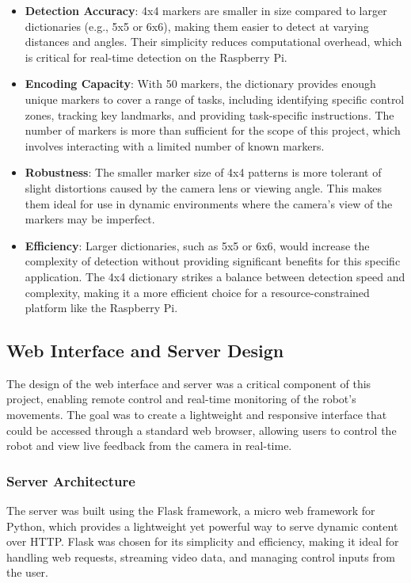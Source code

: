 \begin{itemize}
	\item \textbf{Detection Accuracy}: 4x4 markers are smaller in size compared to larger dictionaries (e.g., 5x5 or 6x6), making them easier to detect at varying distances and angles. Their simplicity reduces computational overhead, which is critical for real-time detection on the Raspberry Pi.
	\item \textbf{Encoding Capacity}: With 50 markers, the dictionary provides enough unique markers to cover a range of tasks, including identifying specific control zones, tracking key landmarks, and providing task-specific instructions. The number of markers is more than sufficient for the scope of this project, which involves interacting with a limited number of known markers.
	\item \textbf{Robustness}: The smaller marker size of 4x4 patterns is more tolerant of slight distortions caused by the camera lens or viewing angle. This makes them ideal for use in dynamic environments where the camera's view of the markers may be imperfect.
	\item \textbf{Efficiency}: Larger dictionaries, such as 5x5 or 6x6, would increase the complexity of detection without providing significant benefits for this specific application. The 4x4 dictionary strikes a balance between detection speed and complexity, making it a more efficient choice for a resource-constrained platform like the Raspberry Pi.
\end{itemize}

\subsection{Web Interface and Server Design}

The design of the web interface and server was a critical component of this project, enabling remote control and real-time monitoring of the robot’s movements. The goal was to create a lightweight and responsive interface that could be accessed through a standard web browser, allowing users to control the robot and view live feedback from the camera in real-time.

\subsubsection{Server Architecture}

The server was built using the Flask framework, a micro web framework for Python, which provides a lightweight yet powerful way to serve dynamic content over HTTP. Flask was chosen for its simplicity and efficiency, making it ideal for handling web requests, streaming video data, and managing control inputs from the user.

